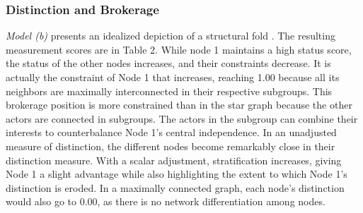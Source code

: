 \subsubsection{Distinction and Brokerage}


\textit{Model (b)} presents an idealized depiction of a structural fold \citep{vedres2010structural}. The resulting measurement scores are in Table 2. While node 1 maintains a high status score, the status of the other nodes increases, and their constraints decrease. It is actually the constraint of Node 1 that increases, reaching 1.00 because all its neighbors are maximally interconnected in their respective subgroups. This brokerage position is more constrained than in the star graph because the other actors are connected in subgroups. The actors in the subgroup can combine their interests to counterbalance Node 1's central independence. In an unadjusted measure of distinction, the different nodes become remarkably close in their distinction measure. With a scalar adjustment, stratification increases, giving Node 1 a slight advantage while also highlighting the extent to which Node 1's distinction is eroded. In a maximally connected graph, each node's distinction would also go to 0.00, as there is no network differentiation among nodes. 

